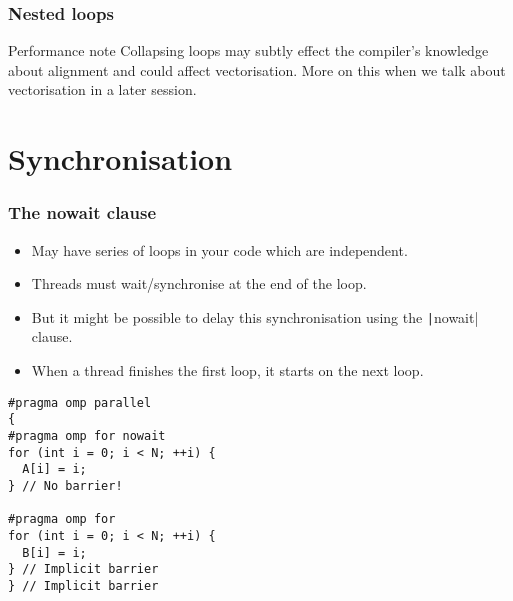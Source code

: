 \documentclass{beamer}
\begin{document}
\begin{frame}
\frametitle{Nested loops}
\begin{block}{Performance note}
Collapsing loops may subtly effect the compiler's knowledge about alignment and could affect vectorisation.
More on this when we talk about vectorisation in a later session.
\end{block}

\end{frame}

\section{Synchronisation}
\begin{frame}[fragile]
\frametitle{The nowait clause}
\begin{itemize}
  \item May have series of loops in your code which are independent.
  \item Threads must wait/synchronise at the end of the loop.
  \item But it might be possible to delay this synchronisation using the \texttt|nowait| clause.
  \item When a thread finishes the first loop, it starts on the next loop.
\end{itemize}

\begin{verbatim}
#pragma omp parallel
{
#pragma omp for nowait
for (int i = 0; i < N; ++i) {
  A[i] = i;
} // No barrier!

#pragma omp for
for (int i = 0; i < N; ++i) {
  B[i] = i;
} // Implicit barrier
} // Implicit barrier
\end{verbatim}
\end{frame}
\end{document}
